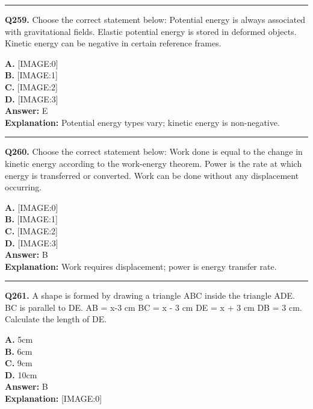 \documentclass[12pt]{article}
\begin{document}
\hrule
\vspace{1em}


\noindent
\textbf{Q259.} Choose the correct statement below:
Potential energy is always associated with gravitational fields.
Elastic potential energy is stored in deformed objects.
Kinetic energy can be negative in certain reference frames.



\textbf{A.} [IMAGE:0] \\
\textbf{B.} [IMAGE:1] \\
\textbf{C.} [IMAGE:2] \\
\textbf{D.} [IMAGE:3] \\

\textbf{Answer:} E \\
\textbf{Explanation:} Potential energy types vary; kinetic energy is non-negative.

\hrule
\vspace{1em}


\noindent
\textbf{Q260.} Choose the correct statement below:
Work done is equal to the change in kinetic energy according to the work-energy theorem.
Power is the rate at which energy is transferred or converted.
Work can be done without any displacement occurring.



\textbf{A.} [IMAGE:0] \\
\textbf{B.} [IMAGE:1] \\
\textbf{C.} [IMAGE:2] \\
\textbf{D.} [IMAGE:3] \\

\textbf{Answer:} B \\
\textbf{Explanation:} Work requires displacement; power is energy transfer rate.

\hrule
\vspace{1em}


\noindent
\textbf{Q261.} A shape is formed by drawing a triangle ABC inside the triangle ADE. BC is parallel to DE. AB = x-3 cm BC = x - 3 cm DE = x + 3 cm DB = 3 cm.
Calculate the length of DE.



\textbf{A.} 5cm \\
\textbf{B.} 6cm \\
\textbf{C.} 9cm \\
\textbf{D.} 10cm \\

\textbf{Answer:} B \\
\textbf{Explanation:} [IMAGE:0]
\end{document}
